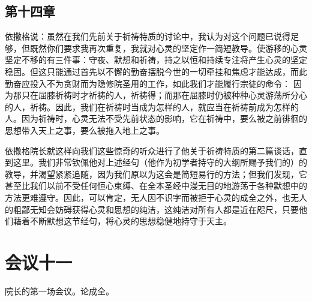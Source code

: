 \subsection{第十四章}

\par

依撒格说：虽然在我们先前关于祈祷特质的讨论中，我认为对这个问题已说得足够，但既然你们要求我再次重复，我就对心灵的坚定作一简短教导。使游移的心灵坚定不移的有三件事：守夜、默想和祈祷，持之以恒和持续专注将产生心灵的坚定稳固。但这只能通过首先以不懈的勤奋摆脱今世的一切牵挂和焦虑才能达成，而此勤奋应投入不为贪财而为隐修院圣用的工作，如此我们才能履行宗徒的命令：  因为那只在屈膝祈祷时才祈祷的人，祈祷得；而那在屈膝时仍被种种心灵游荡所分心的人，祈祷。因此，我们在祈祷时当成为怎样的人，就应当在祈祷前成为怎样的人。因为祈祷时，心灵无法不受先前状态的影响，它在祈祷中，要么被之前徘徊的思想带入天上之事，要么被拖入地上之事。\par

依撒格院长就这样向我们这些惊奇的听众进行了他关于祈祷特质的第二篇谈话，直到这里。我们非常钦佩他对上述经句（他作为初学者持守的大纲所赐予我们的）的教导，并渴望紧紧追随，因为我们原以为这会是简短易行的方法；但我们发现，它甚至比我们以前不受任何恒心束缚、在全本圣经中漫无目的地游荡于各种默想中的方法更难遵守。因此，可以肯定，无人因不识字而被拒于心灵的成全之外，也无人的粗鄙无知会妨碍获得心灵和思想的纯洁，这纯洁对所有人都是近在咫尺，只要他们藉着不断默想这节经句，将心灵的思想稳健地持守于天主。\par



\section{会议十一}

\par

院长的第一场会议。论成全。\par

